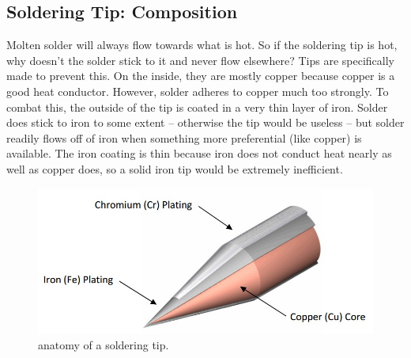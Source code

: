 \subsection{Soldering Tip: Composition}
Molten solder will always flow towards what is hot. So if the soldering tip is hot, why doesn't the solder stick to it and never flow elsewhere? Tips are specifically made to prevent this. On the inside, they are mostly copper because copper is a good heat conductor. However, solder adheres to copper much too strongly. To combat this, the outside of the tip is coated in a very thin layer of iron. Solder does stick to iron to some extent – otherwise the tip would be useless – but solder readily flows off of iron when something more preferential (like copper) is available. The iron coating is thin because iron does not conduct heat nearly as well as copper does, so a solid iron tip would be extremely inefficient.
\begin{figure}[h]
    \caption{anatomy of a soldering tip.}
    \centering \includegraphics[scale=0.75]{images/tip_anatomy.jpg}
\end{figure}

